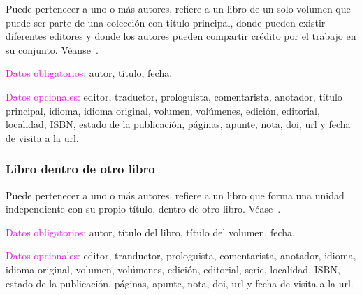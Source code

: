 \documentclass{book}
\begin{document}
{{{{{{{{{{{{{{{{{Puede pertenecer a uno o más autores, refiere a un libro de un solo volumen que puede ser parte de una colección con título principal, donde pueden existir diferentes editores y donde los autores pueden compartir crédito por el trabajo en su conjunto. Véanse~\textcite{libroiliad,Zizek1992}.

\begin{compactdesc}
\item [\textcolor{magenta}{Datos obligatorios:}]  autor, título, fecha.
\item [\textcolor{magenta}{Datos opcionales:}] editor, traductor, prologuista, comentarista, anotador, título principal, idioma, idioma original, volumen, volúmenes, edición, editorial, localidad, ISBN, estado de la publicación, páginas, apunte, nota, doi, url y fecha de visita a la url.
\end{compactdesc}

\begin{mdframed}[linewidth=.5pt,linecolor=black!30,roundcorner=3pt,backgroundcolor=yellow!15]
\noindent\vspace{-12pt}
\printbibliography[keyword=libro,heading=none]
\end{mdframed}

\subsubsection{Libro dentro de otro libro}

Puede pertenecer a uno o más autores, refiere a un libro que forma una unidad independiente con su propio título, dentro de otro libro. Véase~\textcite{Agosti1974}.

\begin{compactdesc}
\item [\textcolor{magenta}{Datos obligatorios:}] autor, título del libro, título del volumen, fecha.
\item [\textcolor{magenta}{Datos opcionales:}] editor, tranductor, prologuista, comentarista, anotador, idioma, idioma original, volumen, volúmenes, edición, editorial, serie, localidad, ISBN, estado de la publicación, páginas, apunte, nota, doi, url y fecha de visita a la url.
\end{compactdesc}

\begin{mdframed}[linewidth=.5pt,linecolor=black!30,roundcorner=3pt,backgroundcolor=yellow!15]
\noindent\vspace{-12pt}
\printbibliography[keyword=libro2libro,heading=none]
\end{mdframed}

}}}}}}}}}}}}}}}}}
\end{document}
